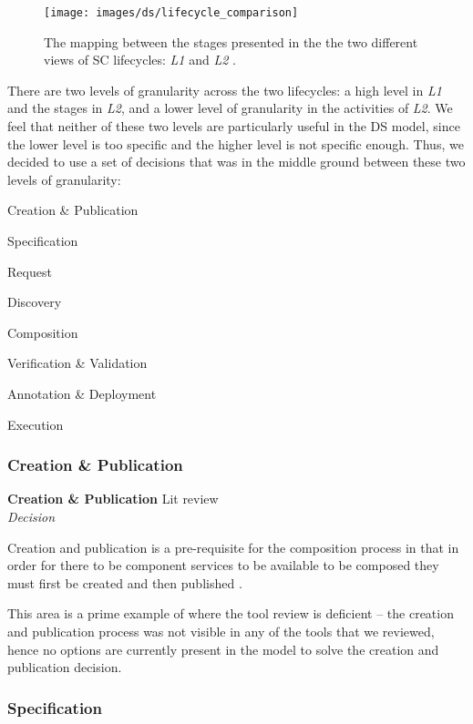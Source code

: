 \begin{figure}[htb]
	\centering
	\texttt{[image: images/ds/lifecycle\_comparison]}
	\caption{The mapping between the stages presented in the the two different views of SC lifecycles: \emph{L1} \cite{Silva2008} and \emph{L2} \cite{Mehandjiev2012}.}
	\label{ds:fig:lifecyle_mapping}
\end{figure}

There are two levels of granularity across the two lifecycles: a high level in \emph{L1} and the stages in \emph{L2}, and a lower level of granularity in the activities of \emph{L2}. We feel that neither of these two levels are particularly useful in the DS model, since the lower level is too specific and the higher level is not specific enough. Thus, we decided to use a set of decisions that was in the middle ground between these two levels of granularity:
\begin{itemize*}
	\item Creation \& Publication
	\item Specification
	\item Request
	\item Discovery
	\item Composition
	\item Verification \& Validation
	\item Annotation \& Deployment
	\item Execution
\end{itemize*}

\subsubsection{Creation \& Publication}

\textbf{Creation \& Publication} \hfill Lit review \cite{Silva2008} \\ \emph{Decision} \hfill 

Creation and publication is a pre-requisite for the composition process in that in order for there to be component services to be available to be composed they must first be created and then published \cite{Silva2008}.

This area is a prime example of where the tool review is deficient -- the creation and publication process was not visible in any of the tools that we reviewed, hence no options are currently present in the model to solve the creation and publication decision.

\subsubsection{Specification} 

